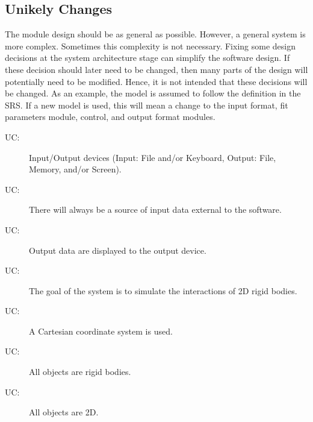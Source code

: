 \documentclass[12pt]{article}
\newcounter{ucnum}
\newcommand{\uctheucnum}{UC\theucnum}
\begin{document}
\subsection{Unikely Changes}
\label{Sec:UC}
The module design should be as general as possible. However, a general system is more complex. Sometimes this complexity is not necessary. Fixing some design decisions at the system architecture stage can simplify the software design. If these decision should later need to be changed, then many parts of the design will potentially need to be modified. Hence, it is not intended that these decisions will be changed.  As an example, the model is assumed to follow the definition in the SRS.  If a new model is used, this will mean a change to the input format, fit parameters module, control, and output format modules.
\begin{description}
\item[\uctheucnum\label{UCIO}:]Input/Output devices (Input: File and/or Keyboard, Output: File, Memory, and/or Screen).
\end{description}
\begin{description}
\item[\uctheucnum\label{UCinputsource}:]There will always be a source of input data external to the software.
\end{description}
\begin{description}
\item[\uctheucnum\label{UCoutput}:]Output data are displayed to the output device.
\end{description}
\begin{description}
\item[\uctheucnum\label{UCgoal}:]The goal of the system is to simulate the interactions of 2D rigid bodies.
\end{description}
\begin{description}
\item[\uctheucnum\label{UCCartesian}:]A Cartesian coordinate system is used.
\end{description}
\begin{description}
\item[\uctheucnum\label{UCrigid}:]All objects are rigid bodies.
\end{description}
\begin{description}
\item[\uctheucnum\label{UC2D}:]All objects are 2D.
\end{description}
\end{document}
